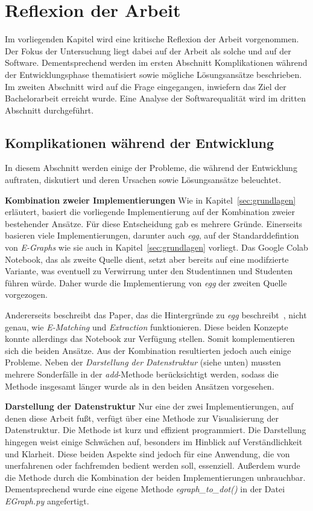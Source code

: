 \section{Reflexion der Arbeit}\label{sec:reflexion}

Im vorliegenden Kapitel wird eine kritische Reflexion der Arbeit vorgenommen. 
Der Fokus der Untersuchung liegt dabei auf der Arbeit als solche und auf der Software.
Dementsprechend werden im ersten Abschnitt Komplikationen während der Entwicklungsphase thematisiert sowie mögliche Lösungsansätze beschrieben.
Im zweiten Abschnitt wird auf die Frage eingegangen, inwiefern das Ziel der Bachelorarbeit erreicht wurde.
Eine Analyse der Softwarequalität wird im dritten Abschnitt durchgeführt.

\subsection{Komplikationen während der Entwicklung}\label{sec:probleme}

In diesem Abschnitt werden einige der Probleme, die während der Entwicklung auftraten, diskutiert und deren Ursachen sowie Lösungsansätze beleuchtet.

\noindent\textbf{Kombination zweier Implementierungen} Wie in Kapitel~\ref{sec:grundlagen} erläutert, basiert die vorliegende Implementierung
auf der Kombination zweier bestehender Ansätze. Für diese Entscheidung gab es mehrere Gründe.
Einerseits basieren viele Implementierungen, darunter auch \textit{egg}, auf der Standarddefintion von \textit{E-Graphs} wie sie auch in Kapitel~\ref{sec:grundlagen} vorliegt.
Das Google Colab Notebook, das als zweite Quelle dient, setzt aber bereits auf eine modifzierte Variante, was eventuell zu Verwirrung unter den Studentinnen und Studenten
führen würde. Daher wurde die Implementierung von \textit{egg} der zweiten Quelle vorgezogen.

Andererseits beschreibt das Paper, das die Hintergründe zu \textit{egg} beschreibt~\cite{2021-egg}, nicht genau, wie \textit{E-Matching} und \textit{Extraction} funktionieren.  
Diese beiden Konzepte konnte allerdings das Notebook zur Verfügung stellen. Somit komplementieren sich die beiden Ansätze.
Aus der Kombination resultierten jedoch auch einige Probleme. Neben der \textit{Darstellung der Datenstruktur} (siehe unten) mussten mehrere Sonderfälle in der \textit{add}-Methode
berücksichtigt werden, sodass die Methode insgesamt länger wurde als in den beiden Ansätzen vorgesehen.

\noindent\textbf{Darstellung der Datenstruktur} Nur eine der zwei Implementierungen, auf denen diese Arbeit fußt, verfügt über eine Methode zur Visualisierung der Datenstruktur.
Die Methode ist kurz und effizient programmiert. Die Darstellung hingegen weist einige Schwächen auf, besonders im Hinblick auf Verständlichkeit und Klarheit.
Diese beiden Aspekte sind jedoch für eine Anwendung, die von unerfahrenen oder fachfremden bedient werden soll, essenziell.
Außerdem wurde die Methode durch die Kombination der beiden Implementierungen unbrauchbar.
Dementsprechend wurde eine eigene Methode \textit{egraph\_to\_dot()} in der Datei \textit{EGraph.py} angefertigt.

